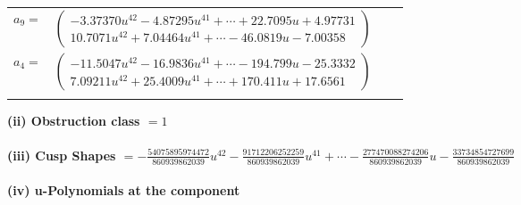 \documentclass[1p]{elsarticle_modified}
\theoremstyle{definition}
\begin{document}
\begin{tabular}{m{7pt} m{180pt} m{7pt} m{180pt} }
\flushright $a_{9}=$&$\begin{pmatrix}-3.37370 u^{42}-4.87295 u^{41}+\cdots+22.7095 u+4.97731\\10.7071 u^{42}+7.04464 u^{41}+\cdots-46.0819 u-7.00358\end{pmatrix}$ \\
\flushright $a_{4}=$&$\begin{pmatrix}-11.5047 u^{42}-16.9836 u^{41}+\cdots-194.799 u-25.3332\\7.09211 u^{42}+25.4009 u^{41}+\cdots+170.411 u+17.6561\end{pmatrix}$\\&\end{tabular}
\flushleft \textbf{(ii) Obstruction class $= 1$}\\~\\
\flushleft \textbf{(iii) Cusp Shapes $= -\frac{54075895974472}{860939862039} u^{42}-\frac{91712206252259}{860939862039} u^{41}+\cdots-\frac{277470088274206}{860939862039} u-\frac{33734854727699}{860939862039}$}\\~\\
\newpage\renewcommand{\arraystretch}{1}
\flushleft \textbf{(iv) u-Polynomials at the component}\newline \\
\end{document}
